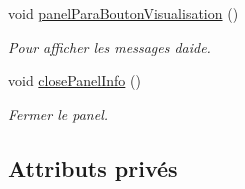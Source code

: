 \begin{DoxyCompactItemize}
void \mbox{\hyperlink{class_navigation_a70f344f826956e694febdfb6fb693af4}{panel\+Para\+Bouton\+Visualisation}} ()
\begin{DoxyCompactList}\small\item\em Pour afficher les messages d\textquotesingle{}aide. \end{DoxyCompactList}\item 
void \mbox{\hyperlink{class_navigation_a050da87d277fee7abae95d3e02912f12}{close\+Panel\+Info}} ()
\begin{DoxyCompactList}\small\item\em Fermer le panel. \end{DoxyCompactList}\end{DoxyCompactItemize}
\subsection*{Attributs privés}
